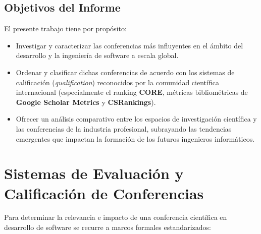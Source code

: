 \documentclass[12pt,a4paper]{article}
\begin{document}
\subsection{Objetivos del Informe}
El presente trabajo tiene por propósito:
\begin{itemize}[leftmargin=*]
    \item Investigar y caracterizar las conferencias más influyentes en el ámbito del desarrollo y la ingeniería de software a escala global.
    \item Ordenar y clasificar dichas conferencias de acuerdo con los sistemas de calificación (\textit{qualification}) reconocidos por la comunidad científica internacional (especialmente el ranking \textbf{CORE}, métricas bibliométricas de \textbf{Google Scholar Metrics} y \textbf{CSRankings}).
    \item Ofrecer un análisis comparativo entre los espacios de investigación científica y las conferencias de la industria profesional, subrayando las tendencias emergentes que impactan la formación de los futuros ingenieros informáticos.
\end{itemize}

\section{Sistemas de Evaluación y Calificación de Conferencias}

Para determinar la relevancia e impacto de una conferencia científica en desarrollo de software se recurre a marcos formales estandarizados:
\end{document}
